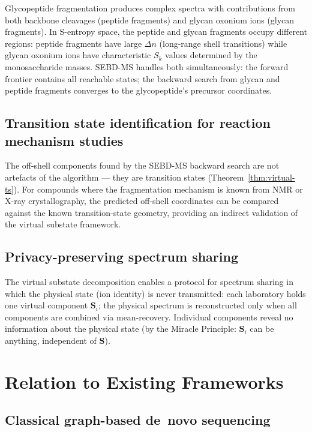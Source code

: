 \documentclass[twocolumn,10pt,a4paper]{article}
\theoremstyle{thmstyle}
\theoremstyle{definition}
\theoremstyle{remark}
\newcommand{\Sv}{\mathbf{S}}
\newcommand{\Sk}{S_{k}}
\begin{document}
Glycopeptide fragmentation produces complex spectra with contributions
from both backbone cleavages (peptide fragments) and glycan oxonium
ions (glycan fragments). In S-entropy space, the peptide and glycan
fragments occupy different regions: peptide fragments have large $\Delta n$
(long-range shell transitions) while glycan oxonium ions have
characteristic $\Sk$ values determined by the monosaccharide masses.
SEBD-MS handles both simultaneously: the forward frontier contains all
reachable states; the backward search from glycan and peptide fragments
converges to the glycopeptide's precursor coordinates.

\subsection{Transition state identification for reaction mechanism studies}

The off-shell components found by the SEBD-MS backward search are
not artefacts of the algorithm --- they are transition states
(Theorem~\ref{thm:virtual-ts}). For compounds where the fragmentation
mechanism is known from NMR or X-ray crystallography, the predicted
off-shell coordinates can be compared against the known transition-state
geometry, providing an indirect validation of the virtual substate
framework.

\subsection{Privacy-preserving spectrum sharing}

The virtual substate decomposition enables a protocol for spectrum sharing
in which the physical state (ion identity) is never transmitted:
each laboratory holds one virtual component $\Sv_i$; the physical
spectrum is reconstructed only when all components are combined via
mean-recovery. Individual components reveal no information about the
physical state (by the Miracle Principle: $\Sv_i$ can be anything,
independent of $\Sv$).

\section{Relation to Existing Frameworks}
\label{sec:relation}

\subsection{Classical graph-based de~novo sequencing}
\end{document}
